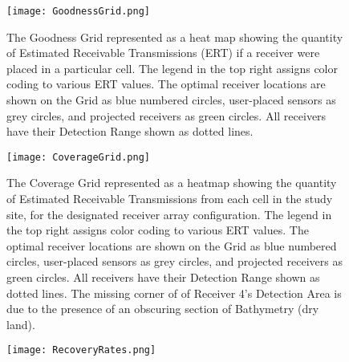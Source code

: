 \begin{figure}[ht]
	\texttt{[image: GoodnessGrid.png]}
	\caption{The Goodness Grid represented as a heat map showing the quantity of Estimated Receivable Transmissions (ERT) if a receiver were placed in a particular cell.  The legend in the top right assigns color coding to various ERT values. The optimal receiver locations are shown on the Grid as blue numbered circles, user-placed sensors as grey circles, and projected receivers as green circles.  All receivers have their Detection Range shown as dotted lines.\label{GoodnessGraph}} 
\end{figure}

\begin{figure}[ht]
	\texttt{[image: CoverageGrid.png]}
	\caption{The Coverage Grid represented as a heatmap showing the quantity of Estimated Receivable Transmissions from each cell in the study site, for the designated receiver array configuration.  The legend in the top right assigns color coding to various ERT values.  The optimal receiver locations are shown on the Grid as blue numbered circles, user-placed sensors as grey circles, and projected receivers as green circles.  All receivers have their Detection Range shown as dotted lines.  The missing corner of of Receiver 4's Detection Area is due to the presence of an obscuring section of Bathymetry (dry land).\label{coverageGraph}}
\end{figure}

\begin{figure}[ht]
	\texttt{[image: RecoveryRates.png]}
	\caption{\label{recoveryGraph}} 
\end{figure}